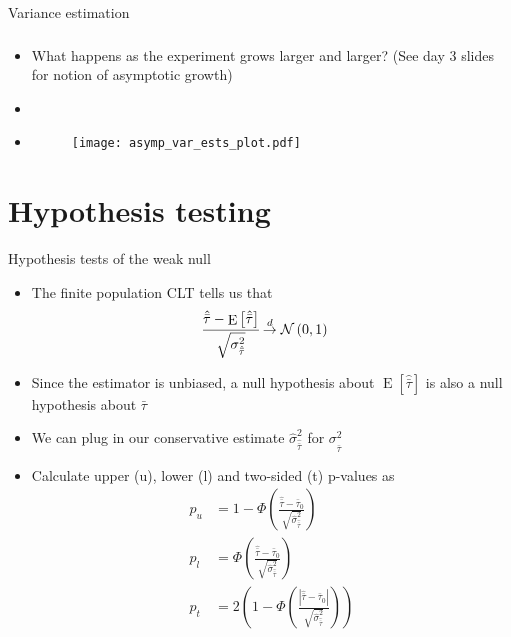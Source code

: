 \documentclass[table, xcolor={dvipsnames}, 9pt]{beamer}
\theoremstyle{newstyle}
\DeclareMathOperator{\E}{\mathrm{E}}
\begin{document}
\begin{frame}{Variance estimation}
\frametitle{}
\begin{itemize}
\item What happens as the experiment grows larger and larger? (See day 3 slides for notion of asymptotic growth) \pause 
\item[]
\item[]
\begin{figure}[H]
\texttt{[image: asymp\_var\_ests\_plot.pdf]}
\end{figure}
\end{itemize}
\end{frame}
\section{Hypothesis testing}
\begin{frame}{Hypothesis tests of the weak null}
\begin{itemize}
\item The finite population CLT tells us that 
\begin{align*}
\cfrac{\hat{\bar{\tau}} - \E\left[\hat{\bar{\tau}}\right]}{\sqrt{\sigma^2_{\hat{\bar{\tau}}}}} & \overset{d}{\to} \mathcal{N}\left(0, 1\right)
\end{align*} \pause 
\item Since the estimator is unbiased, a null hypothesis about $\E\left[\hat{\bar{\tau}}\right]$ is also a null hypothesis about $\bar{\tau}$ \pause 
\item We can plug in our conservative estimate $\hat{\sigma}^2_{\hat{\bar{\tau}}}$ for $\sigma^2_{\hat{\bar{\tau}}}$ \pause 
\item Calculate upper (u), lower (l) and two-sided (t) p-values as \pause 
\begin{align*}
p_u & =  1 - \Phi\left(\frac{\hat{\bar{\tau}} - \bar{\tau}_0}{\sqrt{\hat{\sigma}^2_{\hat{\bar{\tau}}}}}\right) \\
p_l & =  \Phi\left(\frac{\hat{\bar{\tau}} - \bar{\tau}_0}{\sqrt{\hat{\sigma}^2_{\hat{\bar{\tau}}}}}\right) \\
p_t & = 2\left(1 - \Phi\left(\frac{\left\lvert\hat{\bar{\tau}} - \bar{\tau}_0\right\rvert}{\sqrt{\hat{\sigma}^2_{\hat{\bar{\tau}}}}}\right)\right)
\end{align*}
\end{itemize}
\end{frame}
\end{document}
